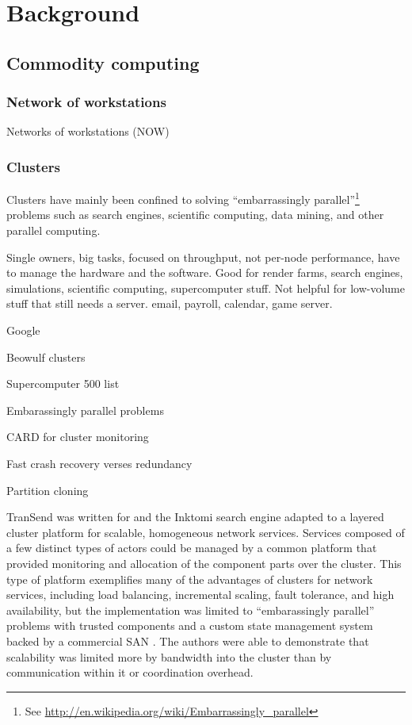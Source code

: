 \chapter{Background}

\section{Commodity computing}

\subsection{Network of workstations}
Networks of workstations (NOW)\cite{anderson95a}

\subsection{Clusters}

Clusters have mainly been confined to solving ``embarrassingly parallel''\footnote{See \url{http://en.wikipedia.org/wiki/Embarrassingly_parallel}} problems such as search engines, scientific computing, data mining, and other parallel computing.

Single owners, big tasks, focused on throughput, not per-node performance, have to manage the hardware and the software. Good for render farms, search engines, simulations, scientific computing, supercomputer stuff. Not helpful for low-volume stuff that still needs a server. email, payroll, calendar, game server.

Google

Beowulf clusters

Supercomputer 500 list

Embarassingly parallel problems

CARD for cluster monitoring\cite{anderson97}

Fast crash recovery verses redundancy\cite{baker94}

Partition cloning \cite{rauch}

TranSend was written for and the Inktomi search engine adapted to a layered cluster platform for scalable, homogeneous network services. Services composed of a few distinct types of actors could be managed by a common platform that provided monitoring and allocation of the component parts over the cluster. This type of platform exemplifies many of the advantages of clusters for network services, including load balancing, incremental scaling, fault tolerance, and high availability, but the implementation was limited to ``embarassingly parallel'' problems with trusted components and a custom state management system backed by a commercial SAN \cite{fox}. The authors were able to demonstrate that scalability was limited more by bandwidth into the cluster than by communication within it or coordination overhead.

